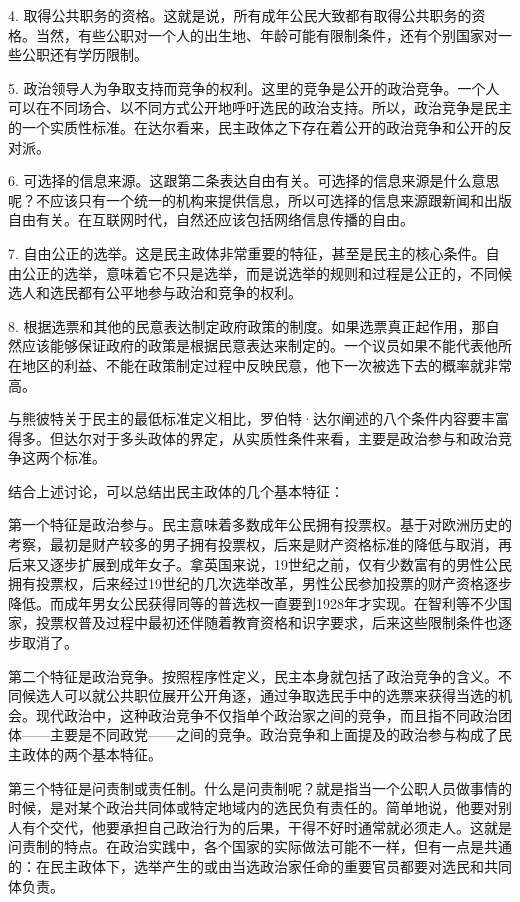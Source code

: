 4. 取得公共职务的资格。这就是说，所有成年公民大致都有取得公共职务的资格。当然，有些公职对一个人的出生地、年龄可能有限制条件，还有个别国家对一些公职还有学历限制。

5. 政治领导人为争取支持而竞争的权利。这里的竞争是公开的政治竞争。一个人可以在不同场合、以不同方式公开地呼吁选民的政治支持。所以，政治竞争是民主的一个实质性标准。在达尔看来，民主政体之下存在着公开的政治竞争和公开的反对派。

6. 可选择的信息来源。这跟第二条表达自由有关。可选择的信息来源是什么意思呢？不应该只有一个统一的机构来提供信息，所以可选择的信息来源跟新闻和出版自由有关。在互联网时代，自然还应该包括网络信息传播的自由。

7. 自由公正的选举。这是民主政体非常重要的特征，甚至是民主的核心条件。自由公正的选举，意味着它不只是选举，而是说选举的规则和过程是公正的，不同候选人和选民都有公平地参与政治和竞争的权利。

8. 根据选票和其他的民意表达制定政府政策的制度。如果选票真正起作用，那自然应该能够保证政府的政策是根据民意表达来制定的。一个议员如果不能代表他所在地区的利益、不能在政策制定过程中反映民意，他下一次被选下去的概率就非常高。

与熊彼特关于民主的最低标准定义相比，罗伯特·达尔阐述的八个条件内容要丰富得多。但达尔对于多头政体的界定，从实质性条件来看，主要是政治参与和政治竞争这两个标准。

结合上述讨论，可以总结出民主政体的几个基本特征：

第一个特征是政治参与。民主意味着多数成年公民拥有投票权。基于对欧洲历史的考察，最初是财产较多的男子拥有投票权，后来是财产资格标准的降低与取消，再后来又逐步扩展到成年女子。拿英国来说，19世纪之前，仅有少数富有的男性公民拥有投票权，后来经过19世纪的几次选举改革，男性公民参加投票的财产资格逐步降低。而成年男女公民获得同等的普选权一直要到1928年才实现。在智利等不少国家，投票权普及过程中最初还伴随着教育资格和识字要求，后来这些限制条件也逐步取消了。

第二个特征是政治竞争。按照程序性定义，民主本身就包括了政治竞争的含义。不同候选人可以就公共职位展开公开角逐，通过争取选民手中的选票来获得当选的机会。现代政治中，这种政治竞争不仅指单个政治家之间的竞争，而且指不同政治团体——主要是不同政党——之间的竞争。政治竞争和上面提及的政治参与构成了民主政体的两个基本特征。

第三个特征是问责制或责任制。什么是问责制呢？就是指当一个公职人员做事情的时候，是对某个政治共同体或特定地域内的选民负有责任的。简单地说，他要对别人有个交代，他要承担自己政治行为的后果，干得不好时通常就必须走人。这就是问责制的特点。在政治实践中，各个国家的实际做法可能不一样，但有一点是共通的：在民主政体下，选举产生的或由当选政治家任命的重要官员都要对选民和共同体负责。

